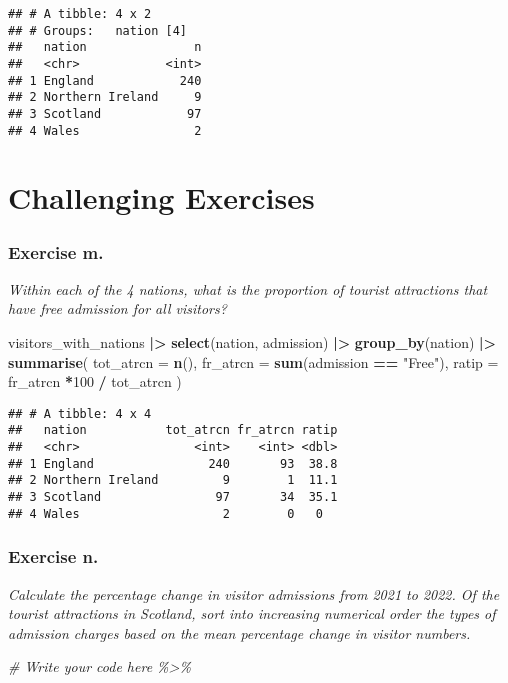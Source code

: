 \documentclass[
]{article}
\newenvironment{Shaded}{\begin{snugshade}}{\end{snugshade}}
\newcommand{\AttributeTok}[1]{\textcolor[rgb]{0.13,0.29,0.53}{#1}}
\newcommand{\CommentTok}[1]{\textcolor[rgb]{0.56,0.35,0.01}{\textit{#1}}}
\newcommand{\DecValTok}[1]{\textcolor[rgb]{0.00,0.00,0.81}{#1}}
\newcommand{\FunctionTok}[1]{\textcolor[rgb]{0.13,0.29,0.53}{\textbf{#1}}}
\newcommand{\NormalTok}[1]{#1}
\newcommand{\SpecialCharTok}[1]{\textcolor[rgb]{0.81,0.36,0.00}{\textbf{#1}}}
\newcommand{\StringTok}[1]{\textcolor[rgb]{0.31,0.60,0.02}{#1}}
\begin{document}
\begin{verbatim}
## # A tibble: 4 x 2
## # Groups:   nation [4]
##   nation               n
##   <chr>            <int>
## 1 England            240
## 2 Northern Ireland     9
## 3 Scotland            97
## 4 Wales                2
\end{verbatim}

\section{Challenging Exercises}\label{challenging-exercises}

\subsubsection{Exercise m.}\label{exercise-m.}

\emph{Within each of the 4 nations, what is the proportion of tourist
attractions that have free admission for all visitors?}

\begin{Shaded}
\begin{Highlighting}[]
\NormalTok{visitors\_with\_nations }\SpecialCharTok{|\textgreater{}} 
  \FunctionTok{select}\NormalTok{(nation, admission) }\SpecialCharTok{|\textgreater{}} 
  \FunctionTok{group\_by}\NormalTok{(nation) }\SpecialCharTok{|\textgreater{}}
  \FunctionTok{summarise}\NormalTok{(}
    \AttributeTok{tot\_atrcn =} \FunctionTok{n}\NormalTok{(),}
    \AttributeTok{fr\_atrcn =} \FunctionTok{sum}\NormalTok{(admission }\SpecialCharTok{==} \StringTok{"Free"}\NormalTok{),}
    \AttributeTok{ratip =}\NormalTok{ fr\_atrcn }\SpecialCharTok{*}\DecValTok{100} \SpecialCharTok{/}\NormalTok{ tot\_atrcn}
\NormalTok{    )}
\end{Highlighting}
\end{Shaded}

\begin{verbatim}
## # A tibble: 4 x 4
##   nation           tot_atrcn fr_atrcn ratip
##   <chr>                <int>    <int> <dbl>
## 1 England                240       93  38.8
## 2 Northern Ireland         9        1  11.1
## 3 Scotland                97       34  35.1
## 4 Wales                    2        0   0
\end{verbatim}

\subsubsection{Exercise n.}\label{exercise-n.}

\emph{Calculate the percentage change in visitor admissions from 2021 to
2022. Of the tourist attractions in Scotland, sort into increasing
numerical order the types of admission charges based on the mean
percentage change in visitor numbers.}

\begin{Shaded}
\begin{Highlighting}[]
\CommentTok{\# Write your code here \%\textgreater{}\%}
\end{Highlighting}
\end{Shaded}
\end{document}
